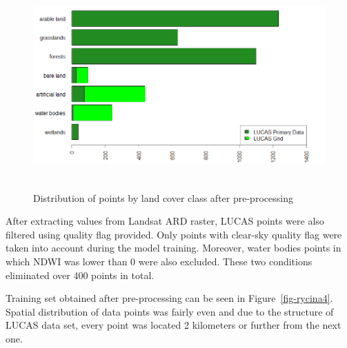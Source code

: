 \documentclass{amuthesis}
\begin{document}
\begin{figure}[t]

{\centering \includegraphics[width=5.75in,height=3.125in]{./figures/lucas_data.png}

}

\caption{\label{fig-rycina3}Distribution of points by land cover class
after pre-processing}

\end{figure}

After extracting values from Landsat ARD raster, LUCAS points were also
filtered using quality flag provided. Only points with clear-sky quality
flag were taken into account during the model training. Moreover, water
bodies points in which NDWI was lower than 0 were also excluded. These
two conditions eliminated over 400 points in total.

Training set obtained after pre-processing can be seen in
Figure~\ref{fig-rycina4}. Spatial distribution of data points was fairly
even and due to the structure of LUCAS data set, every point was located
2 kilometers or further from the next one.
\end{document}
